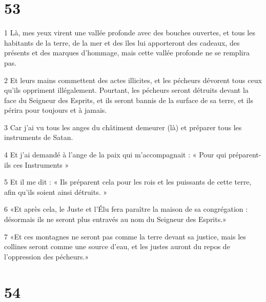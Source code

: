 \chapter{53}

\par 1 Là, mes yeux virent une vallée profonde avec des bouches ouvertes, et tous les habitants de la terre, de la mer et des îles lui apporteront des cadeaux, des présents et des marques d'hommage, mais cette vallée profonde ne se remplira pas.
\par 2 Et leurs mains commettent des actes illicites, et les pécheurs dévorent tous ceux qu'ils oppriment illégalement. Pourtant, les pécheurs seront détruits devant la face du Seigneur des Esprits, et ils seront bannis de la surface de sa terre, et ils périra pour toujours et à jamais.
\par 3 Car j'ai vu tous les anges du châtiment demeurer (là) et préparer tous les instruments de Satan.
\par 4 Et j'ai demandé à l'ange de la paix qui m'accompagnait : « Pour qui préparent-ils ces Instruments »
\par 5 Et il me dit : « Ils préparent cela pour les rois et les puissants de cette terre, afin qu'ils soient ainsi détruits. »
\par 6 «Et après cela, le Juste et l'Élu fera paraître la maison de sa congrégation : désormais ils ne seront plus entravés au nom du Seigneur des Esprits.»
\par 7 «Et ces montagnes ne seront pas comme la terre devant sa justice, mais les collines seront comme une source d'eau, et les justes auront du repos de l'oppression des pécheurs.»

\chapter{54}

